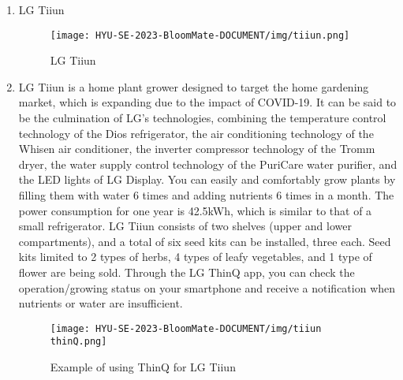 \documentclass[conference, a4paper]{IEEEtran}
\begin{document}
\begin{enumerate}
\item LG Tiiun
\begin{figure}[h]
\centering
\texttt{[image: HYU-SE-2023-BloomMate-DOCUMENT/img/tiiun.png]}
\label{fig:tiiun}
\caption{LG Tiiun} 
\end{figure}
\item[] LG Tiiun is a home plant grower designed to target the home gardening market, which is expanding due to the impact of COVID-19. It can be said to be the culmination of LG's technologies, combining the temperature control technology of the Dios refrigerator, the air conditioning technology of the Whisen air conditioner, the inverter compressor technology of the Tromm dryer, the water supply control technology of the PuriCare water purifier, and the LED lights of LG Display. You can easily and comfortably grow plants by filling them with water 6 times and adding nutrients 6 times in a month. The power consumption for one year is 42.5kWh, which is similar to that of a small refrigerator. LG Tiiun consists of two shelves (upper and lower compartments), and a total of six seed kits can be installed, three each. Seed kits limited to 2 types of herbs, 4 types of leafy vegetables, and 1 type of flower are being sold. Through the LG ThinQ app, you can check the operation/growing status on your smartphone and receive a notification when nutrients or water are insufficient. \\
\begin{figure}[h]
\texttt{[image: HYU-SE-2023-BloomMate-DOCUMENT/img/tiiun thinQ.png]}
\label{fig:tiiunThinQ}
\caption{Example of using ThinQ for LG Tiiun} 
\end{figure}
\end{enumerate}
\end{document}
